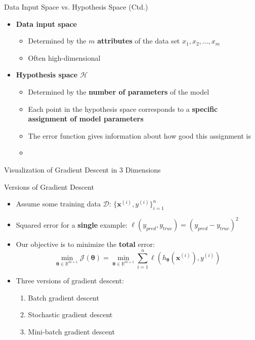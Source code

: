 \begin{frame}{Data Input Space vs. Hypothesis Space (Ctd.)}{}
	\begin{itemize}
		\item \textbf{Data input space}
		\begin{itemize}
			\item Determined by the $m$ \textbf{attributes} of the data set $x_1, x_2, \dots, x_m$
			\item Often high-dimensional
		\end{itemize}
		\item \textbf{Hypothesis space $\mathcal{H}$}
		\begin{itemize}
			\item Determined by the \textbf{number of parameters} of the model
			\item Each point in the hypothesis space corresponds to a \textbf{specific assignment of model parameters}
			\item The error function gives information about how good this assignment is
			\item {}
		\end{itemize}
	\end{itemize}
\end{frame}


\begin{frame}{Visualization of Gradient Descent in 3 Dimensions}{}
	
\end{frame}


\begin{frame}{Versions of Gradient Descent}{}
	\begin{itemize}
		\item Assume some training data $\mathcal{D}$: $\{ \bm{x}^{(i)}, y^{(i)} \}_{i=1}^{n}$
		\item Squared error for a \textbf{single} example: $\ell(y_{pred}, y_{true}) = (y_{pred} - y_{true})^2$
		\item Our objective is to minimize the \textbf{total} error:
		\begin{equation*}
			\min_{\bm{\theta} \in \mathbb{R}^{m+1}} \mathcal{J}(\bm{\theta}) =
				\min_{\bm{\theta} \in \mathbb{R}^{m+1}} \sum_{i=1}^n \ell(h_{\bm{\theta}}(\bm{x}^{(i)}), y^{(i)})
		\end{equation*}
		\item Three versions of gradient descent:
		\begin{enumerate}
			\item Batch gradient descent
			\item Stochastic gradient descent
			\item Mini-batch gradient descent
		\end{enumerate}
	\end{itemize}
\end{frame}



